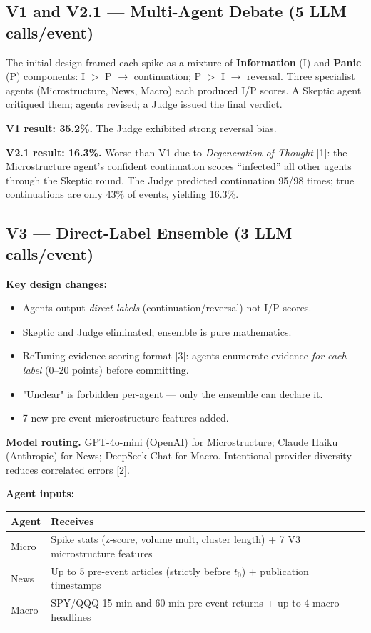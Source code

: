 \documentclass[11pt, a4paper]{article}
\begin{document}
\subsection{V1 and V2.1 — Multi-Agent Debate (5 LLM calls/event)}

The initial design framed each spike as a mixture of \textbf{Information} (I) and \textbf{Panic} (P) components: I $>$ P $\to$ continuation; P $>$ I $\to$ reversal. Three specialist agents (Microstructure, News, Macro) each produced I/P scores. A Skeptic agent critiqued them; agents revised; a Judge issued the final verdict.

\textbf{V1 result: 35.2\%.} The Judge exhibited strong reversal bias.

\textbf{V2.1 result: 16.3\%.} Worse than V1 due to \emph{Degeneration-of-Thought} [1]: the Microstructure agent's confident continuation scores ``infected'' all other agents through the Skeptic round. The Judge predicted continuation 95/98 times; true continuations are only 43\% of events, yielding 16.3\%.

\subsection{V3 — Direct-Label Ensemble (3 LLM calls/event)}

\textbf{Key design changes:}
\begin{itemize}[leftmargin=1.5em, itemsep=2pt]
    \item Agents output \emph{direct labels} (continuation/reversal) not I/P scores.
    \item Skeptic and Judge eliminated; ensemble is pure mathematics.
    \item ReTuning evidence-scoring format [3]: agents enumerate evidence \emph{for each label} (0--20 points) before committing.
    \item "Unclear" is forbidden per-agent — only the ensemble can declare it.
    \item 7 new pre-event microstructure features added.
\end{itemize}

\textbf{Model routing.} GPT-4o-mini (OpenAI) for Microstructure; Claude Haiku (Anthropic) for News; DeepSeek-Chat for Macro. Intentional provider diversity reduces correlated errors [2].

\textbf{Agent inputs:}
\begin{center}
\renewcommand{\arraystretch}{1.2}
\begin{tabular}{lp{9.5cm}}
\toprule
\textbf{Agent} & \textbf{Receives} \\
\midrule
Micro & Spike stats (z-score, volume mult, cluster length) + 7 V3 microstructure features \\
News  & Up to 5 pre-event articles (strictly before $t_0$) + publication timestamps \\
Macro & SPY/QQQ 15-min and 60-min pre-event returns + up to 4 macro headlines \\
\bottomrule
\end{tabular}
\end{center}
\end{document}
